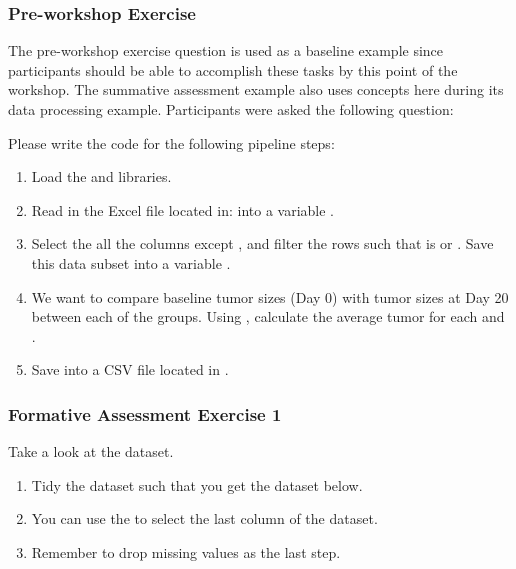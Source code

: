 \documentclass[040-assessment.tex]{subfiles}
\begin{document}
\subsubsection{Pre-workshop Exercise}

    The pre-workshop exercise question is used as a baseline example since participants should
    be able to accomplish these tasks by this point of the workshop.
    The summative assessment example also uses concepts here during its data processing example.
    Participants were asked the following question:

    \begin{displayquote}

        Please write the code for the following pipeline steps:

        \begin{enumerate}
            \item Load the  and  libraries.
            \item Read in the Excel file located in:
                   into a variable .
            \item Select the all the columns except ,
                  and filter the rows such that  is  or .
                  Save this data subset into a variable .
            \item We want to compare baseline tumor sizes (Day 0) with tumor sizes at Day 20 between each of the groups.
                  Using ,
                  calculate the average tumor  for each  and .
            \item Save  into a CSV file located in .
        \end{enumerate}

    \end{displayquote}

\subsubsection{Formative Assessment Exercise 1}

    \begin{displayquote}
        Take a look at the  dataset.
        \begin{enumerate}
            \item Tidy the dataset such that you get the dataset below.
            \item You can use the  to select the last column of the dataset.
            \item Remember to drop missing values as the last step.
        \end{enumerate}

    \end{displayquote}
\end{document}
